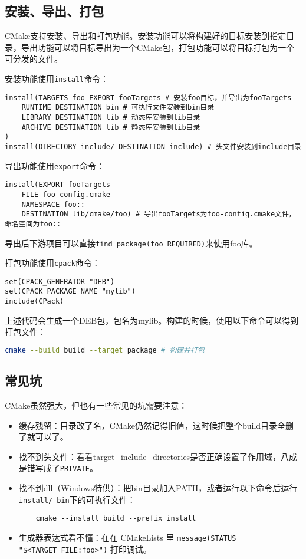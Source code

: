 \documentclass[../main.tex]{subfiles}
\begin{document}
\subsection{安装、导出、打包}

CMake支持安装、导出和打包功能。安装功能可以将构建好的目标安装到指定目录，导出功能可以将目标导出为一个CMake包，打包功能可以将目标打包为一个可分发的文件。

安装功能使用\texttt{install}命令：
\begin{lstlisting}
install(TARGETS foo EXPORT fooTargets # 安装foo目标，并导出为fooTargets
    RUNTIME DESTINATION bin # 可执行文件安装到bin目录
    LIBRARY DESTINATION lib # 动态库安装到lib目录
    ARCHIVE DESTINATION lib # 静态库安装到lib目录
)
install(DIRECTORY include/ DESTINATION include) # 头文件安装到include目录
\end{lstlisting}

导出功能使用\texttt{export}命令：
\begin{lstlisting}
install(EXPORT fooTargets
    FILE foo-config.cmake
    NAMESPACE foo::
    DESTINATION lib/cmake/foo) # 导出fooTargets为foo-config.cmake文件，命名空间为foo::
\end{lstlisting}
导出后下游项目可以直接\texttt{find\_package(foo REQUIRED)}来使用foo库。

打包功能使用\texttt{cpack}命令：
\begin{lstlisting}
set(CPACK_GENERATOR "DEB")
set(CPACK_PACKAGE_NAME "mylib")
include(CPack)
\end{lstlisting}
上述代码会生成一个DEB包，包名为mylib。构建的时候，使用以下命令可以得到打包文件：
\begin{lstlisting}[language=bash]
cmake --build build --target package # 构建并打包
\end{lstlisting}

\subsection{常见坑}
CMake虽然强大，但也有一些常见的坑需要注意：
\begin{itemize}
    \item 缓存残留：目录改了名，CMake仍然记得旧值，这时候把整个build目录全删了就可以了。
    \item 找不到头文件：看看target\_include\_directories是否正确设置了作用域，八成是错写成了\texttt{PRIVATE}。
    \item 找不到dll（Windows特供）：把bin目录加入PATH，或者运行以下命令后运行\texttt{install/ bin}下的可执行文件：
\begin{lstlisting}
    cmake --install build --prefix install
\end{lstlisting}
    \item 生成器表达式看不懂：在在 CMakeLists 里 \texttt{message(STATUS "\$<TARGET\_FILE:foo>")} 打印调试。
\end{itemize}
\end{document}
